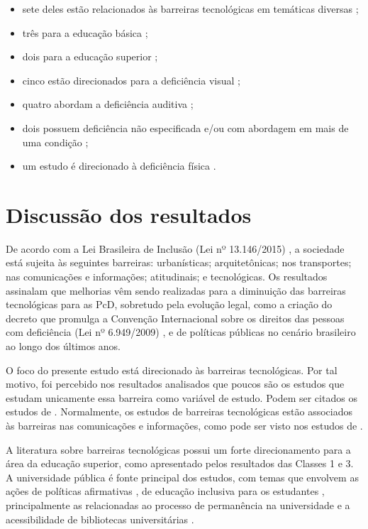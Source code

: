 \documentclass{textolivre}
\begin{document}
\begin{itemize}
    \item sete deles estão relacionados às barreiras tecnológicas em temáticas diversas \cite{barbosa2018, borges2018, carvalho2003, oliveira2015, soares2016, souza2018, souza2016};
    \item três para a educação básica \cite{bruno2019, petroni2018, santarosa2012};
    \item dois para a educação superior \cite{flor2015, lazzarin2015};
    \item cinco estão direcionados para a deficiência visual \cite{borges2018, bruno2019, lazzarin2015, oliveira2015, souza2018};
    \item quatro abordam a deficiência auditiva \cite{barbosa2018, flor2015, soares2016, souza2016};
    \item dois possuem deficiência não especificada e/ou com abordagem em mais de uma condição \cite{carvalho2003, santarosa2012};
    \item um estudo é direcionado à deficiência física \cite{petroni2018}.
\end{itemize}

\section{Discussão dos resultados}
De acordo com a Lei Brasileira de Inclusão (Lei nº 13.146/2015) \cite{brasil_lei_2015}, a sociedade está sujeita às seguintes barreiras: urbanísticas; arquitetônicas; nos transportes; nas comunicações e informações; atitudinais; e tecnológicas. Os resultados assinalam que melhorias vêm sendo realizadas para a diminuição das barreiras tecnológicas para as PcD, sobretudo pela evolução legal, como a criação do decreto que promulga a Convenção Internacional sobre os direitos das pessoas com deficiência (Lei nº 6.949/2009) \cite{brasil_lei_2009}, e de políticas públicas no cenário brasileiro ao longo dos últimos anos.

O foco do presente estudo está direcionado às barreiras tecnológicas. Por tal motivo, foi percebido nos resultados analisados que poucos são os estudos que estudam unicamente essa barreira como variável de estudo. Podem ser citados os estudos de \textcite{vianna2017, cantoranietal2015}. Normalmente, os estudos de barreiras tecnológicas estão associados às barreiras nas comunicações e informações, como pode ser visto nos estudos de \textcite{santarosa2015, camargo2008}.

A literatura sobre barreiras tecnológicas possui um forte direcionamento para a área da educação superior, como apresentado pelos resultados das Classes 1 e 3. A universidade pública é fonte principal dos estudos, com temas que envolvem as ações de políticas afirmativas \cite{ciantelli2016, melo2018, oliveira2013, siqueira2010}, de educação inclusiva para os estudantes \cite{branco2019, marins2009}, principalmente as relacionadas ao processo de permanência na universidade \cite{anache2018, garcia2018, oliveira2013} e a acessibilidade de bibliotecas universitárias \cite{souza2019}.
\end{document}
